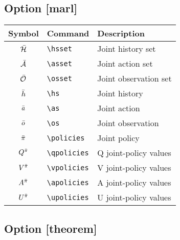\documentclass{article}
\begin{document}
\subsection*{Option [marl]}

\begin{tabular}{cll}
  \toprule
  Symbol & Command & Description \\
  \midrule
  $\bar{\mathcal{H}}$ & \verb|\hsset| & Joint history set \\
  $\bar{\mathcal{A}}$ & \verb|\asset| & Joint action set \\
  $\bar{\mathcal{O}}$ & \verb|\osset| & Joint observation set \\
  \midrule
  ${\bar{h}}$ & \verb|\hs| & Joint history \\
  ${\bar{a}}$ & \verb|\as| & Joint action \\
  ${\bar{o}}$ & \verb|\os| & Joint observation \\
  \midrule
  ${\bar{\pi}}$ & \verb|\policies| & Joint policy \\
  \midrule
  $Q^{{\bar{\pi}}}$ & \verb|\qpolicies| & Q joint-policy values \\
  $V^{{\bar{\pi}}}$ & \verb|\vpolicies| & V joint-policy values \\
  $A^{{\bar{\pi}}}$ & \verb|\apolicies| & A joint-policy values \\
  $U^{{\bar{\pi}}}$ & \verb|\upolicies| & U joint-policy values \\
  \bottomrule
\end{tabular}

\subsection*{Option [theorem]}
\end{document}
